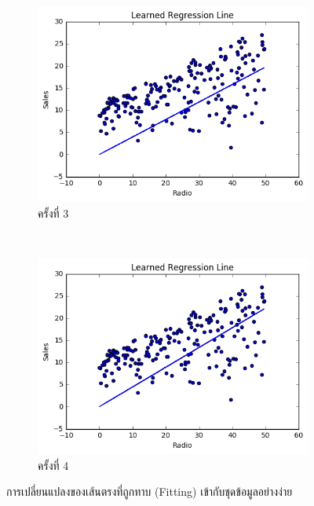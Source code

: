 \begin{figure}[H]\ContinuedFloat
    \centering
    \begin{subfigure}{0.8\textwidth}
        \centering
        \includegraphics[width=0.9\linewidth]{fig/plot_simple_reg_3.png}
        \caption{ครั้งที่ 3}
        \label{fig:plot_simple_reg_3}
    \end{subfigure}
    \\
    \begin{subfigure}{0.8\textwidth}
        \centering
        \includegraphics[width=0.9\linewidth]{fig/plot_simple_reg_4.png}
        \caption{ครั้งที่ 4}
        \label{fig:plot_simple_reg_4}
    \end{subfigure}
    \caption{การเปลี่ยนแปลงของเส้นตรงที่ถูกทาบ (Fitting) เข้ากับชุดข้อมูลอย่างง่าย}
    \label{fig:simple_reg_change}
\end{figure}

